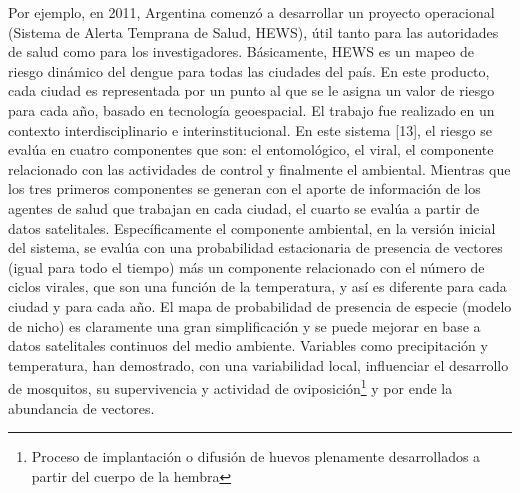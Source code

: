 \par Por ejemplo, en 2011, Argentina comenzó a desarrollar un proyecto operacional
  (Sistema de Alerta Temprana de Salud, HEWS), útil tanto para las autoridades de
  salud como para los investigadores.
  Básicamente, HEWS es un mapeo de riesgo dinámico del dengue para todas las
  ciudades del país. En este producto, cada ciudad es representada por un punto
  al que se le asigna un valor de riesgo para cada año, basado en tecnología
  geoespacial. El trabajo fue realizado en un contexto interdisciplinario e
  interinstitucional. En este sistema [13], el riesgo se evalúa en cuatro componentes que son: el
  entomológico, el viral, el componente relacionado con las actividades de
  control y finalmente el ambiental. Mientras que los tres primeros componentes
  se generan con el aporte de información de los agentes de salud que trabajan en cada
  ciudad, el cuarto se evalúa a partir de datos satelitales.
  Específicamente el componente ambiental, en la versión inicial del sistema, se
  evalúa con una probabilidad estacionaria de presencia de vectores (igual para
  todo el tiempo) más un componente relacionado con el número de ciclos virales,
  que son una función de la temperatura, y así es diferente para cada ciudad y
  para cada año. El mapa de probabilidad de presencia de especie (modelo de nicho)
  es claramente una gran simplificación y se puede mejorar en base a datos
  satelitales continuos del medio ambiente. Variables como precipitación y
  temperatura, han demostrado, con una variabilidad local, influenciar el
  desarrollo de mosquitos, su supervivencia y actividad de
  oviposición\footnote{Proceso de implantación o difusión de huevos plenamente
  desarrollados a partir del cuerpo de la hembra} y por ende la abundancia de vectores.

